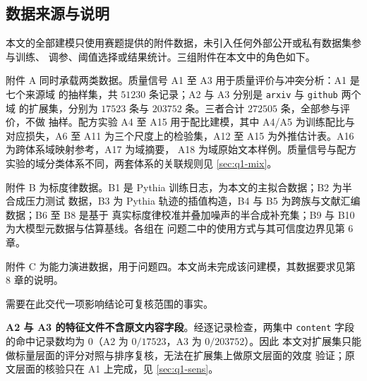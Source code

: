 \documentclass[bwprint]{gmcmthesis}
\numberwithin{equation}{section}
\numberwithin{figure}{section}
\numberwithin{table}{section}
\begin{document}
%

\subsection{数据来源与说明}

本文的全部建模只使用赛题提供的附件数据，未引入任何外部公开或私有数据集参与训练、
调参、阈值选择或结果统计。三组附件在本文中的角色如下。

附件 A 同时承载两类数据。质量信号 A1 至 A3 用于质量评价与冲突分析：A1 是七个来源域
的抽样集，共 $51230$ 条记录；A2 与 A3 分别是 \texttt{arxiv} 与 \texttt{github} 两个域
的扩展集，分别为 $17523$ 条与 $203752$ 条。三者合计 $272505$ 条，全部参与评价，不做
抽样。配方实验 A4 至 A15 用于配比建模，其中 A4/A5 为训练配比与对应损失，A6 至 A11
为三个尺度上的检验集，A12 至 A15 为外推估计表。A16 为跨体系域映射参考，A17 为域摘要，
A18 为域原始文本样例。质量信号与配方实验的域分类体系不同，两套体系的关联规则见
\ref{sec:q1-mix}。

附件 B 为标度律数据。B1 是 Pythia 训练日志，为本文的主拟合数据；B2 为半合成压力测试
数据，B3 为 Pythia 轨迹的插值构造，B4 与 B5 为跨族与文献汇编数据；B6 至 B8 是基于
真实标度律校准并叠加噪声的半合成补充集；B9 与 B10 为大模型元数据与估算基线。各组在
问题二中的使用方式与其可信度边界见第 6 章。

附件 C 为能力演进数据，用于问题四。本文尚未完成该问建模，其数据要求见第 8 章的说明。

需要在此交代一项影响结论可复核范围的事实。

\textbf{A2 与 A3 的特征文件不含原文内容字段}。经逐记录检查，两集中
\texttt{content} 字段的命中记录数均为 $0$（A2 为 $0/17523$，A3 为 $0/203752$）。因此
本文对扩展集只能做标量层面的评分对照与排序复核，无法在扩展集上做原文层面的效度
验证；原文层面的核验只在 A1 上完成，见 \ref{sec:q1-sens}。
\end{document}
